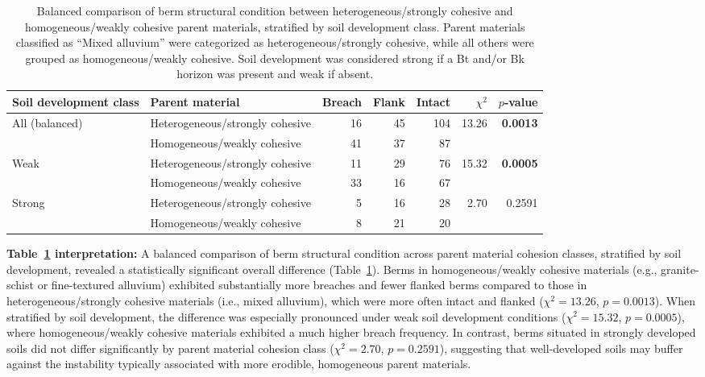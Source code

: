 \documentclass[review]{elsarticle}
\begin{document}
\begin{table}[h!]
\centering
\caption{\normalsize Balanced comparison of berm structural condition between heterogeneous/strongly cohesive and homogeneous/weakly cohesive parent materials, stratified by soil development class. Parent materials classified as ``Mixed alluvium'' were categorized as heterogeneous/strongly cohesive, while all others were grouped as homogeneous/weakly cohesive. Soil development was considered strong if a Bt and/or Bk horizon was present and weak if absent.}
\small
\begin{tabular}{|l|l|r|r|r|r|r|}
\hline
\textbf{Soil development class} & \textbf{Parent material} & \textbf{Breach} & \textbf{Flank} & \textbf{Intact} & \textbf{$\chi^2$} & \textbf{$p$-value} \\
\hline
\multirow{2}{*}{All (balanced)} & Heterogeneous/strongly cohesive & 16 & 45 & 104 & \multirow{2}{*}{13.26} & \multirow{2}{*}{\textbf{0.0013}} \\
& Homogeneous/weakly cohesive & 41 & 37 & 87 & & \\
\hline
\multirow{2}{*}{Weak} & Heterogeneous/strongly cohesive & 11 & 29 & 76 & \multirow{2}{*}{15.32} & \multirow{2}{*}{\textbf{0.0005}} \\
& Homogeneous/weakly cohesive & 33 & 16 & 67 & & \\
\hline
\multirow{2}{*}{Strong} & Heterogeneous/strongly cohesive & 5 & 16 & 28 & \multirow{2}{*}{2.70} & \multirow{2}{*}{0.2591} \\
& Homogeneous/weakly cohesive & 8 & 21 & 20 & & \\
\hline
\end{tabular}
\label{tab:parentmat_soildev_chi}
\end{table}

\textbf{Table~\ref{tab:parentmat_soildev_chi} interpretation:} A balanced comparison of berm structural condition across parent material cohesion classes, stratified by soil development, revealed a statistically significant overall difference (Table~\ref{tab:parentmat_soildev_chi}). Berms in homogeneous/weakly cohesive materials (e.g., granite-schist or fine-textured alluvium) exhibited substantially more breaches and fewer flanked berms compared to those in heterogeneous/strongly cohesive materials (i.e., mixed alluvium), which were more often intact and flanked ($\chi^2 = 13.26$, $p = 0.0013$). When stratified by soil development, the difference was especially pronounced under weak soil development conditions ($\chi^2 = 15.32$, $p = 0.0005$), where homogeneous/weakly cohesive materials exhibited a much higher breach frequency. In contrast, berms situated in strongly developed soils did not differ significantly by parent material cohesion class ($\chi^2 = 2.70$, $p = 0.2591$), suggesting that well-developed soils may buffer against the instability typically associated with more erodible, homogeneous parent materials.
\end{document}
